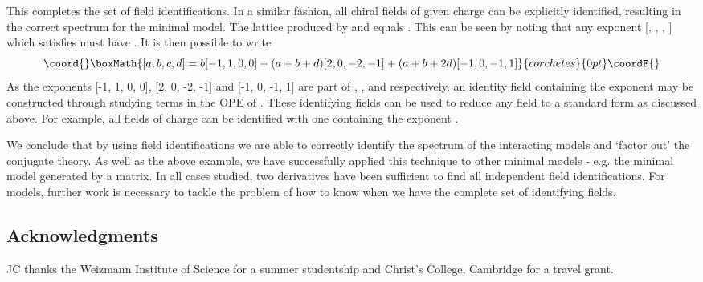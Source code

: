 \documentclass[a4paper,a4paper]{article}
\begin{document}
This completes the set of field identifications. In a similar fashion, all chiral fields of given charge can be explicitly identified, resulting in the 
correct spectrum for the \coordHE{} minimal model.
The lattice \coordHE{} produced by \coordHE{} and \coordHE{} equals \coordHE{}. This can be seen by noting that any
exponent [\coordHE{}, \coordHE{}, \coordHE{}, \coordHE{}] which satisfies \coordHE{} must have \coordHE{}. It is then possible to write
\begin{displaymath}\coord{}\boxMath{
[a,b,c,d] = b[-1,1,0,0] + (a+b+d)[2,0,-2,-1] + (a+b+2d)[-1,0,-1,1]
}{corchetes}{0pt}\coordE{}\end{displaymath}
As the exponents [-1, 1, 0, 0], [2, 0, -2, -1] and [-1, 0, -1, 1] are part of \coordHE{}, \coordHE{}, and \coordHE{} respectively, 
an identity field containing the exponent \myHighlight{$[a, b, c, d]$}\coordHE{}  may be constructed through studying terms in the OPE of 
\coordHE{}. These identifying fields can be used to reduce any field to a standard form as discussed above. For example, all fields
of charge \coordHE{} can be identified with one containing the exponent \coordHE{}.

We conclude that by using field identifications we are able to correctly identify the spectrum of the interacting models and `factor out' 
the conjugate theory. As well as the above example, we have successfully applied this technique to other minimal models - e.g. 
the \coordHE{} minimal model generated by a \coordHE{}  \myHighlight{$\Gamma$}\coordHE{} matrix. In all cases studied, two derivatives have been sufficient to find all independent field
identifications. For \coordHE{} models, further work is necessary to tackle the problem of how to know when we have the complete set of identifying fields.

\subsection*{Acknowledgments}

JC thanks the Weizmann Institute of Science for a summer studentship and Christ's College, Cambridge for a travel grant.
\end{document}
